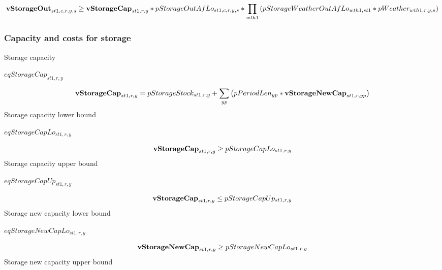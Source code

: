 \documentclass{article}
\begin{document}
\begin{dmath}
{\bf vStorageOut}_{st1,c,r,y,s}  \ge  {\bf vStorageCap}_{st1,r,y}*pStorageOutAfLo_{st1,c,r,y,s}*\prod_{wth1}{\left(pStorageWeatherOutAfLo_{wth1,st1}*pWeather_{wth1,r,y,s}\right)}
\end{dmath}
\subsubsection*{Capacity and costs for storage}
Storage capacity







$eqStorageCap_{st1,r,y}$





\begin{dmath}
{\bf vStorageCap}_{st1,r,y}  =  pStorageStock_{st1,r,y}+\sum_{yp}{\left(pPeriodLen_{yp}*{\bf vStorageNewCap}_{st1,r,yp}\right)}
\end{dmath}
Storage capacity lower bound







$eqStorageCapLo_{st1,r,y}$





\begin{dmath}
{\bf vStorageCap}_{st1,r,y}  \ge  pStorageCapLo_{st1,r,y}
\end{dmath}
Storage capacity upper bound







$eqStorageCapUp_{st1,r,y}$





\begin{dmath}
{\bf vStorageCap}_{st1,r,y}  \le  pStorageCapUp_{st1,r,y}
\end{dmath}
Storage new capacity lower bound







$eqStorageNewCapLo_{st1,r,y}$





\begin{dmath}
{\bf vStorageNewCap}_{st1,r,y}  \ge  pStorageNewCapLo_{st1,r,y}
\end{dmath}
Storage new capacity upper bound
\end{document}
